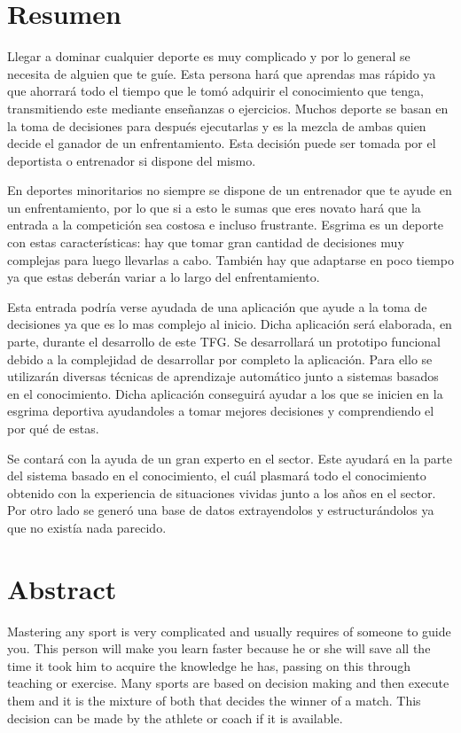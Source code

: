 \chapter{Resumen}

Llegar a dominar cualquier deporte es muy complicado y por lo general se necesita
de alguien que te guíe. Esta persona hará que aprendas mas rápido ya que ahorrará
todo el tiempo que le tomó adquirir el conocimiento que tenga, transmitiendo este
mediante enseñanzas o ejercicios. Muchos deporte se basan en la toma de decisiones
para después ejecutarlas y es la mezcla de ambas quien decide el ganador de un
enfrentamiento. Esta decisión puede ser tomada por el deportista o entrenador si
dispone del mismo.

En deportes minoritarios no siempre se dispone de un entrenador que te ayude
en un enfrentamiento, por lo que si a esto le sumas que eres novato hará
que la entrada a la competición sea costosa e incluso frustrante. Esgrima
es un deporte con estas características: hay que tomar gran cantidad de decisiones
muy complejas para luego llevarlas a cabo. También hay que adaptarse en poco tiempo
ya que estas deberán variar a lo largo del enfrentamiento.


Esta entrada podría verse ayudada de una aplicación que ayude a la toma
de decisiones ya que es lo mas complejo al inicio. Dicha aplicación será elaborada,
en parte, durante el desarrollo de este \acf{TFG}. Se desarrollará un
prototipo funcional debido a la complejidad de desarrollar por completo la aplicación.
Para ello se utilizarán diversas técnicas de aprendizaje automático junto a sistemas
basados en el conocimiento. Dicha aplicación conseguirá ayudar a los que
se inicien en la esgrima deportiva ayudandoles a tomar mejores decisiones y comprendiendo
el por qué de estas.

Se contará con la ayuda de un gran experto en el sector. Este ayudará
en la parte del sistema basado en el conocimiento, el cuál plasmará todo el conocimiento
obtenido con la experiencia de situaciones vividas junto a los años en el sector. Por otro lado se generó una base de datos extrayendolos y estructurándolos ya que no
existía nada parecido.

\chapter{Abstract}

Mastering any sport is very complicated and usually requires
of someone to guide you. This person will make you learn faster because he or she will save
all the time it took him to acquire the knowledge he has, passing on this
through teaching or exercise. Many sports are based on decision making
and then execute them and it is the mixture of both that decides the winner of a
match. This decision can be made by the athlete or coach if it is available.

